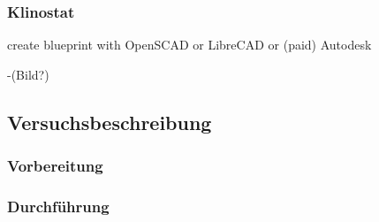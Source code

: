 \documentclass[
a4paper, 
11pt, 
ngerman,
listof=totoc,
bibliography=totocnumbered,
abstracton
]{scrreprt}
\begin{document}
\subsubsection{Klinostat}

create blueprint with OpenSCAD or LibreCAD or (paid) Autodesk

-(Bild?)

\subsection{Versuchsbeschreibung}

\subsubsection{Vorbereitung}

\subsubsection{Durchführung}




\end{document}

